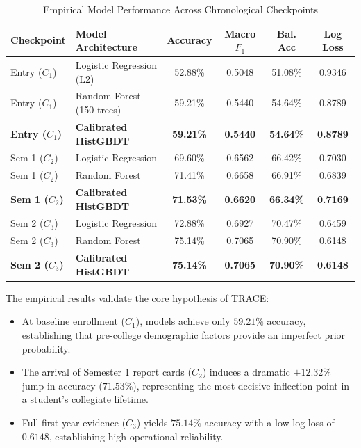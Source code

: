 \documentclass[conference]{IEEEtran}
\begin{document}
\begin{table}[htbp]
\caption{Empirical Model Performance Across Chronological Checkpoints}
\label{tab:results}
\begin{center}
\begin{tabular}{llcccc}
\toprule
\textbf{Checkpoint} & \textbf{Model Architecture} & \textbf{Accuracy} & \textbf{Macro $F_1$} & \textbf{Bal. Acc} & \textbf{Log Loss} \\
\midrule
Entry ($C_1$) & Logistic Regression (L2) & 52.88\% & 0.5048 & 51.08\% & 0.9346 \\
Entry ($C_1$) & Random Forest (150 trees) & 59.21\% & 0.5440 & 54.64\% & 0.8789 \\
\textbf{Entry ($C_1$)} & \textbf{Calibrated HistGBDT} & \textbf{59.21\%} & \textbf{0.5440} & \textbf{54.64\%} & \textbf{0.8789} \\
\midrule
Sem 1 ($C_2$) & Logistic Regression & 69.60\% & 0.6562 & 66.42\% & 0.7030 \\
Sem 1 ($C_2$) & Random Forest & 71.41\% & 0.6658 & 66.91\% & 0.6839 \\
\textbf{Sem 1 ($C_2$)} & \textbf{Calibrated HistGBDT} & \textbf{71.53\%} & \textbf{0.6620} & \textbf{66.34\%} & \textbf{0.7169} \\
\midrule
Sem 2 ($C_3$) & Logistic Regression & 72.88\% & 0.6927 & 70.47\% & 0.6459 \\
Sem 2 ($C_3$) & Random Forest & 75.14\% & 0.7065 & 70.90\% & 0.6148 \\
\textbf{Sem 2 ($C_3$)} & \textbf{Calibrated HistGBDT} & \textbf{75.14\%} & \textbf{0.7065} & \textbf{70.90\%} & \textbf{0.6148} \\
\bottomrule
\end{tabular}
\end{center}
\end{table}

The empirical results validate the core hypothesis of TRACE:
\begin{itemize}
    \item At baseline enrollment ($C_1$), models achieve only $59.21\%$ accuracy, establishing that pre-college demographic factors provide an imperfect prior probability.
    \item The arrival of Semester 1 report cards ($C_2$) induces a dramatic $+12.32\%$ jump in accuracy ($71.53\%$), representing the most decisive inflection point in a student's collegiate lifetime.
    \item Full first-year evidence ($C_3$) yields $75.14\%$ accuracy with a low log-loss of $0.6148$, establishing high operational reliability.
\end{itemize}
\end{document}
